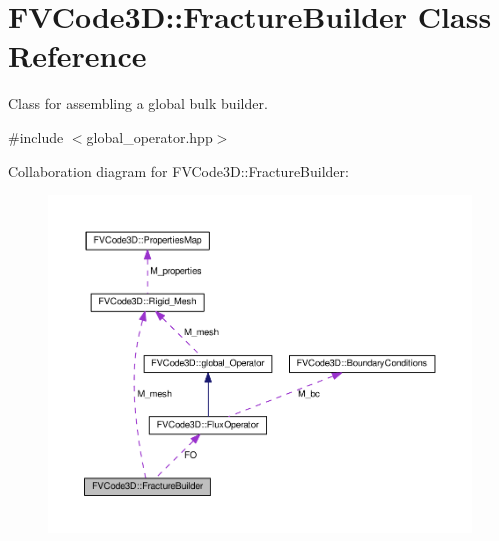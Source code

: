 \hypertarget{classFVCode3D_1_1FractureBuilder}{}\section{F\+V\+Code3D\+:\+:Fracture\+Builder Class Reference}
\label{classFVCode3D_1_1FractureBuilder}


Class for assembling a global bulk builder.  




{\ttfamily \#include $<$global\+\_\+operator.\+hpp$>$}



Collaboration diagram for F\+V\+Code3D\+:\+:Fracture\+Builder\+:
\nopagebreak
\begin{figure}[H]
\begin{center}
\leavevmode
\includegraphics[width=350pt]{classFVCode3D_1_1FractureBuilder__coll__graph}
\end{center}
\end{figure}
